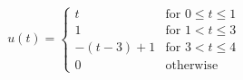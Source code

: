 \documentclass[preview]{standalone}
\begin{document}
\begin{align*}
u(t) = \begin{cases} t & \text{for } 0 \leq t \leq 1 \\ 1 & \text{for } 1 < t \leq 3 \\ -(t-3) + 1 & \text{for } 3 < t \leq 4 \\ 0 & \text{otherwise} \end{cases}
\end{align*}
\end{document}
